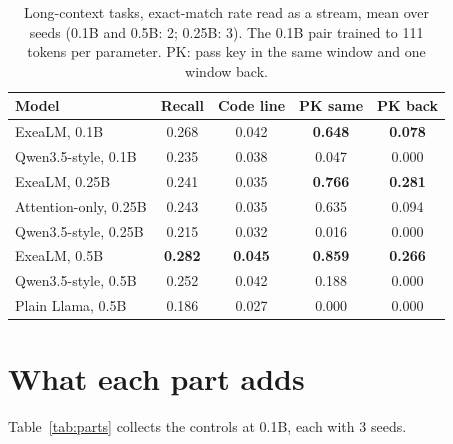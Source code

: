 \documentclass[10pt,twocolumn,letterpaper]{article}
\begin{document}
\begin{table}[t]
\centering\small
\setlength{\tabcolsep}{3pt}
\caption{Long-context tasks, exact-match rate read as a stream, mean over seeds (0.1B and 0.5B: 2; 0.25B: 3). The 0.1B pair trained to 111 tokens per parameter. PK: pass key in the same window and one window back.}
\label{tab:longctx}
\begin{tabular}{@{}l cccc@{}}
\toprule
Model & Recall & Code line & PK same & PK back \\
\midrule
ExeaLM, 0.1B & 0.268 & 0.042 & \textbf{0.648} & \textbf{0.078} \\
Qwen3.5-style, 0.1B & 0.235 & 0.038 & 0.047 & 0.000 \\
ExeaLM, 0.25B & 0.241 & 0.035 & \textbf{0.766} & \textbf{0.281} \\
Attention-only, 0.25B & 0.243 & 0.035 & 0.635 & 0.094 \\
Qwen3.5-style, 0.25B & 0.215 & 0.032 & 0.016 & 0.000 \\
ExeaLM, 0.5B & \textbf{0.282} & \textbf{0.045} & \textbf{0.859} & \textbf{0.266} \\
Qwen3.5-style, 0.5B & 0.252 & 0.042 & 0.188 & 0.000 \\
Plain Llama, 0.5B & 0.186 & 0.027 & 0.000 & 0.000 \\
\bottomrule
\end{tabular}
\end{table}

\section{What each part adds}
\label{sec:parts}

Table~\ref{tab:parts} collects the controls at 0.1B, each with 3 seeds.
\end{document}
